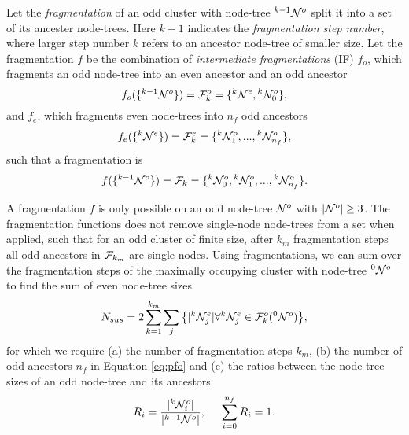 \begin{definition}\label{def:fragmentation}
  Let the \emph{fragmentation} of an odd cluster with node-tree ${}^{k-1}\mathcal{N}^o$ split it into a set of its ancester node-trees. Here $k-1$ indicates the \emph{fragmentation step number}, where larger step number $k$ refers to an ancestor node-tree of smaller size. Let the fragmentation $f$ be the combination of \emph{intermediate fragmentations} (IF) $f_o$, which fragments an odd node-tree into an even ancestor and an odd ancestor
  \begin{equation}\label{eq:pfo}
    f_o(\{\pre{k-1}\nset^o\}) = \m{F}^o_k = \{\pre{k}\nset^e, \pre{k}\nset^o_0 \}, 
  \end{equation}
  and $f_e$, which fragments even node-trees into $n_f$ odd ancestors
  \begin{equation}\label{eq:pfe}
    f_e(\{\pre{k}\nset^e\}) = \m{F}^e_k=\{\pre{k}\nset^{o}_1,...,\pre{k}\nset^o_{n_f}\},
  \end{equation}
  such that a fragmentation is
  \begin{equation}\label{eq:fstep}
    f(\{\pre{k-1}\nset^o\}) = \m{F}_k = \{\pre{k}\nset^o_0,\pre{k}\nset^{o}_1,...,\pre{k}\nset^{o}_{n_f}\}.
  \end{equation}
\end{definition}

A fragmentation $f$ is only possible on an odd node-tree $\mathcal{N}^o$ with $|{\mathcal{N}^o}| \geq 3$. The fragmentation functions does not remove single-node node-trees from a set when applied, such that for an odd cluster of finite size, after $k_m$ fragmentation steps all odd ancestors in $\mathcal{F}_{k_{m}}$ are single nodes. Using fragmentations, we can sum over the fragmentation steps of the maximally occupying cluster with node-tree ${}^{0}\mathcal{N}^o$ to find the sum of even node-tree sizes
\begin{equation}\label{eq:npdc}
  N_{sus} = 2\sum_{k=1}^{k_{m}}{ \sum_j{ \left\{ \abs{\pre{k}\nset_j^e} \forall \pre{k}\nset_j^e \in \m{F}^o_k(\pre{0}\nset^o)\right\} } },
\end{equation}
for which we require (a) the number of fragmentation steps $k_m$, (b) the number of odd ancestors $n_f$ in Equation \eqref{eq:pfo} and (c) the ratios between the node-tree sizes of an odd node-tree and its ancestors
\begin{equation}\label{eq:ratio}
  R_i = \frac{\abs{\pre{k}\nset^o_i}}{\abs{\pre{k-1}\nset^o}}, \hspace{0.5cm} \sum_{i=0}^{n_f}{R_i} = 1.
\end{equation}

